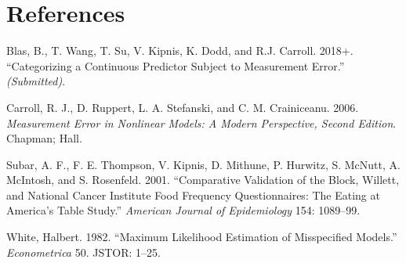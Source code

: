 \documentclass[15 pt,]{article}
\begin{document}
\section*{References}\label{references}

\hypertarget{refs}{}
\hypertarget{ref-twbb2018}{}
Blas, B., T. Wang, T. Su, V. Kipnis, K. Dodd, and R.J. Carroll. 2018+.
``Categorizing a Continuous Predictor Subject to Measurement Error.''
\emph{(Submitted)}.

\hypertarget{ref-Carroll2006}{}
Carroll, R. J., D. Ruppert, L. A. Stefanski, and C. M. Crainiceanu.
2006. \emph{Measurement Error in Nonlinear Models: A Modern Perspective,
Second Edition}. Chapman; Hall.

\hypertarget{ref-EATS2001}{}
Subar, A. F., F. E. Thompson, V. Kipnis, D. Mithune, P. Hurwitz, S.
McNutt, A. McIntosh, and S. Rosenfeld. 2001. ``Comparative Validation of
the Block, Willett, and National Cancer Institute Food Frequency
Questionnaires: The Eating at America's Table Study.'' \emph{American
Journal of Epidemiology} 154: 1089--99.

\hypertarget{ref-white1982maximum}{}
White, Halbert. 1982. ``Maximum Likelihood Estimation of Misspecified
Models.'' \emph{Econometrica} 50. JSTOR: 1--25.
\end{document}
